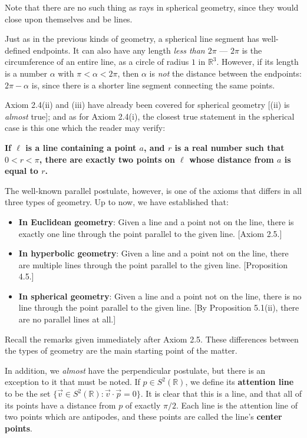 \documentclass[leqno]{book}
\begin{document}
\noindent Note that there are no such thing as rays in spherical geometry, since they would close upon themselves and be lines.

Just as in the previous kinds of geometry, a spherical line segment has well-defined endpoints.  It can also have any length \emph{less than $2\pi$} \---- $2\pi$ is the circumference of an entire line, as a circle of radius $1$ in $\mathbb R^3$.  However, if its length is a number $\alpha$ with $\pi<\alpha<2\pi$, then $\alpha$ is \emph{not} the distance between the endpoints: $2\pi-\alpha$ is, since there is a shorter line segment connecting the same points.

Axiom 2.4(ii) and (iii) have already been covered for spherical geometry [(ii) is \emph{almost} true]; and as for Axiom 2.4(i), the closest true statement in the spherical case is this one which the reader may verify:
\begin{center}
\textbf{If $\ell$ is a line containing a point $a$, and $r$ is a real number such that $0<r<\pi$, there are exactly two points on $\ell$ whose distance from $a$ is equal to $r$.}
\end{center}
The well-known parallel postulate, however, is one of the axioms that differs in all three types of geometry.  Up to now, we have established that:
\begin{itemize}
\item \textbf{In Euclidean geometry}: Given a line and a point not on the line, there is exactly one line through the point parallel to the given line.  [Axiom 2.5.]

\item \textbf{In hyperbolic geometry}: Given a line and a point not on the line, there are multiple lines through the point parallel to the given line.  [Proposition 4.5.]

\item \textbf{In spherical geometry}: Given a line and a point not on the line, there is no line through the point parallel to the given line.  [By Proposition 5.1(ii), there are no parallel lines at all.]
\end{itemize}
Recall the remarks given immediately after Axiom 2.5.  These differences between the types of geometry are the main starting point of the matter.

In addition, we \emph{almost} have the perpendicular postulate, but there is an exception to it that must be noted.  If $p\in S^2(\mathbb R)$, we define its \textbf{attention line} to be the set $\{\vec v\in S^2(\mathbb R):\vec v\cdot\vec p=0\}$.  It is clear that this is a line, and that all of its points have a distance from $p$ of exactly $\pi/2$.  Each line is the attention line of two points which are antipodes, and these points are called the line's \textbf{center points}.\\
\end{document}

